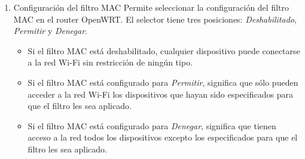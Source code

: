 \documentclass[12pt]{article}
\begin{document}
\begin{enumerate}
            \item Configuración del filtro MAC
            Permite seleccionar la configuración del filtro MAC en el router OpenWRT. El selector tiene tres posiciones: \textit{Deshabilitado}, \textit{Permitir} y \textit{Denegar}.
            \begin{itemize}
                \item Si el filtro MAC está deshabilitado, cualquier dispositivo puede conectarse a la red Wi-Fi sin restricción de ningún tipo.
                \item Si el filtro MAC está configurado para \textit{Permitir}, significa que sólo pueden acceder a la red Wi-Fi los dispositivos que hayan sido especificados para que el filtro les sea aplicado.
                \item Si el filtro MAC está configurado para \textit{Denegar}, significa que tienen acceso a la red todos los dispositivos excepto los especificados para que el filtro les sea aplicado.
            \end{itemize}
            

\end{enumerate}
\end{document}
